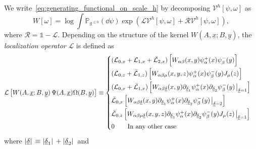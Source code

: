 \documentclass[a4paper, 11pt]{article}
\newcommand{\dgauss}[2]{\mathbb{P}_{#1}(\dd #2)}			%
\newcommand{\id}{\mathds{1}}								%
\newcommand{\sing}[2]{{#1}^{#2}}							%
\newcommand{\loc}{\mathcal{L}}								%
\newcommand{\ren}{\mathcal{R}}								%
\newcommand{\src}{\omega}									%
\newcommand{\Src}{\Omega}
\theoremstyle{thm}
\begin{document}
We write~\eqref{eq:generating_functional_on_scale_h} by decomposing $\sing{\mathscr{V}}{h}[\psi, \omega]$ as
\begin{equation}
\label{eq:generating_functional_RL}
W[\src] = \log \int \dgauss{\sing{g}{\le h}}{\psi}
\exp(\loc \sing{\mathscr{V}}{h}[\psi, \src] + \ren \sing{\mathscr{V}}{h}[\psi, \src]),
\end{equation}
where $\ren=\id-\loc$. Depending on the structure of the kernel $W(A, \underline{x}; B, \underline{y})$, the \emph{localization operator} $\loc$ is defined as 
\begin{equation}
\label{eq:localization_definition}
\loc \left[ W(A, \underline{x}; B, \underline{y}) \, \Psi(A, \underline{x})\Src(B, \underline{y}) \right] \equiv
\begin{cases}
(\loc_{0, x} + \loc_{1, x} + \bar{\loc}_{2, x})\left[ W_{\alpha \beta}(x, y) \psi^+_\alpha(x) \psi^-_\beta(y) \right] \\[5pt]
(\loc_{0, z} + \bar{\loc}_{1, z}) \left[ W_{\alpha \beta \mu}(x, y, z) \psi^+_\alpha(x) \psi^-_\beta(y) J_\mu(z) \right] \\[5pt]
(\loc_{0, x} + \bar{\loc}_{1, x}) \left[ W_{\alpha \beta \underline{\delta}}(x, y) \partial_{\underline{\delta}_1} \psi^+_\alpha(x) \partial_{\underline{\delta}_2} \psi^-_\beta(y) \eval_{\underline{\delta} = 1} \right] \\[5pt]
\bar{\loc}_{0, x} \left[ W_{\alpha \beta \underline{\delta}}(x, y) \partial_{\underline{\delta}_1} \psi^+_\alpha(x) \partial_{\underline{\delta}_2} \psi^-_\beta(y) \eval_{\underline{\delta} = 2} \right] \\[5pt]
\bar{\loc}_{0, z} \left[ W_{\alpha \beta \mu \underline{\delta}}(x, y, z) \partial_{\underline{\delta}_1} \psi^+_\alpha(x) \partial_{\underline{\delta}_2} \psi^-_\beta(y) J_\mu(z) \eval_{\underline{\delta} = 1} \right] \\[5pt]
0	\qquad	\text{In any other case}
\end{cases}
\end{equation}
where $\abs*{\underline{\delta}} \equiv \abs*{\underline{\delta}_1} + \abs*{\underline{\delta}_2}$ and
\end{document}

